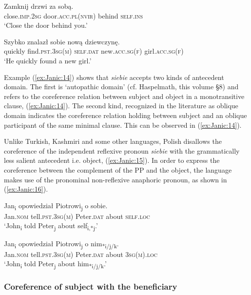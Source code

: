 \documentclass[output=paper]{langscibook}
\begin{document}
\ex \label{ex:Janic:14e}
\gll Zamknij		 drzwi		 za		sobą.	\\ 			
		close.\textsc{imp.2sg}	door.\textsc{acc.pl(nvir)}	behind	\textsc{self.ins}\\
\glt ‘Close the door behind you.’

\ex \label{ex:Janic:14f}
\gll Szybko	znalazł 		 sobie 		 nową 		 dziewczynę.\\
		quickly	find.\textsc{pst.3sg(m)}	\textsc{self.dat}	new.\textsc{acc.sg(f)}	girl.\textsc{acc.sg(f)}\\
\glt ‘He quickly found a new girl.’
\z 
\z 

Example (\ref{ex:Janic:14}) shows that \textit{siebie} accepts two kinds of antecedent domain. The first is ‘autopathic domain’ (cf. Haspelmath, this volume §8) and refers to the coreference relation between subject and object in a monotransitive clause, (\ref{ex:Janic:14}). The second kind, recognized in the literature as oblique domain indicates the coreference relation holding between subject and an oblique participant of the same minimal clause. This can be observed in (\ref{ex:Janic:14}).

Unlike Turkish, Kashmiri and some other languages, Polish disallows the coreference of the independent reflexive pronoun \textit{siebie} with the grammatically less salient antecedent i.e. object, (\ref{ex:Janic:15}). In order to express the coreference between the complement of the PP and the object, the language makes use of the pronominal non-reflexive anaphoric pronoun, as shown in (\ref{ex:Janic:16}).

\ea \label{ex:Janic:15}
\gll Jan\textsubscript{i} opowiedział		 Piotrowi\textsubscript{j} o	 sobie.\\
	 Jan.\textsc{nom}	 tell.\textsc{pst.3sg(m)}	Peter.\textsc{dat}	 about	\textsc{self.loc}\\
\glt ‘John\textsubscript{i} told Peter\textsubscript{j} about self\textsubscript{i,*j}.'
\z 
	
\ea \label{ex:Janic:16}
\gll Jan\textsubscript{i}		opowiedział		 Piotrowi\textsubscript{j}	 o	 nim\textsubscript{*i/j/k}.\\
	 Jan.\textsc{nom}	 tell.\textsc{pst.3sg(m)}	Peter.\textsc{dat}	 about	\textsc{3sg(m).loc}\\
\glt ‘John\textsubscript{i} told Peter\textsubscript{j} about him\textsubscript{*i/j/k}.’ \citep[193]{Siewierska2004}
\z 

\subsubsection{Coreference of subject with the beneficiary} \label{sec:Janic:3.1.3}
\end{document}
